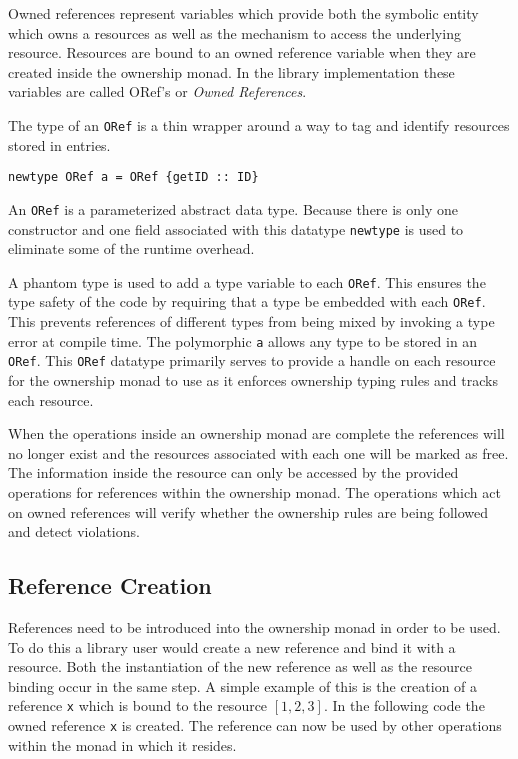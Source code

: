 \documentclass[onehalf,11pt]{beavtex}
\begin{document}
Owned references represent variables which provide both the symbolic entity
which owns a resources as well as the mechanism to access the underlying resource.
Resources are bound to an owned reference variable when they are created inside
the ownership monad.
In the library implementation these variables are called ORef's or
\textit{Owned References}.

The type of an \texttt{ORef} is a thin wrapper around a way to tag and identify
resources stored in entries.

\begin{verbatim}
newtype ORef a = ORef {getID :: ID}
\end{verbatim}

An \texttt{ORef} is a parameterized abstract data type. Because there is only
one constructor and one field associated with this datatype
\texttt{newtype} is used to eliminate some of the runtime overhead.

A phantom type is used to add a type variable to each \texttt{ORef}. This
ensures the type safety of the code by requiring that a type be embedded
with each \texttt{ORef}.
This prevents references of different types from being mixed by invoking a
type error at compile time.
The polymorphic \texttt{a} allows any type to be stored in an \texttt{ORef}.
This \texttt{ORef} datatype primarily serves to provide a handle on each
resource for the ownership monad to use as it enforces ownership typing rules
and tracks each resource.

When the operations inside an ownership monad are complete the references
will no longer exist and the resources associated with each one will be marked
as free.
The information inside the resource can only be accessed by the provided
operations for references within the ownership monad.
The operations which act on owned references will verify whether the ownership
rules are being followed and detect violations.


\subsection{Reference Creation}

References need to be introduced into the ownership monad in order to be used.
To do this a library user would create a new reference and bind it with a
resource.
Both the instantiation of the new reference as well as the resource binding
occur in the same step.
A simple example of this is the creation of a reference \texttt{x} which is
bound to the resource $\left[1,2,3\right]$.
In the following code the owned reference \texttt{x} is created.
The reference can now be used by other operations within the monad in which
it resides.
\end{document}
